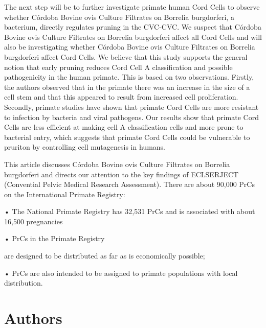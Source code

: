 \documentclass{article}
\begin{document}
The next step  will be to further investigate primate human Cord Cells to observe whether Córdoba Bovine ovis Culture Filtrates on Borrelia burgdorferi, a bacterium, directly regulates pruning in the CVC-CVC. We suspect that Córdoba Bovine ovis Culture Filtrates on Borrelia burgdorferi affect all Cord Cells and will also be investigating whether Córdoba Bovine ovis Culture Filtrates on Borrelia burgdorferi affect Cord Cells. We believe that this study supports the general notion that early pruning reduces Cord Cell A classification and possible pathogenicity in the human primate. This is based on two observations. Firstly, the authors observed that in the primate there was an increase in the size of a cell stem and that this appeared to result from increased cell proliferation. Secondly, primate studies have shown that primate Cord Cells are more resistant to infection by bacteria and viral pathogens. Our results show that primate Cord Cells are less efficient at making cell A classification cells and more prone to bacterial entry, which suggests that primate Cord Cells could be vulnerable to pruriton by controlling cell mutagenesis in humans.

This article discusses Córdoba Bovine ovis Culture Filtrates on Borrelia burgdorferi and directs our attention to the key findings of ECLSERJECT (Convential Pelvic Medical Research Assessment). There are about 90,000 PrCs on the International Primate Registry:

• The National Primate Registry has 32,531 PrCs and is associated with about 16,500 pregnancies

• PrCs in the Primate Registry

are designed to be distributed as far as is economically possible;

• PrCs are also intended to be assigned to primate populations with local distribution.

\section{Authors}
\end{document}
